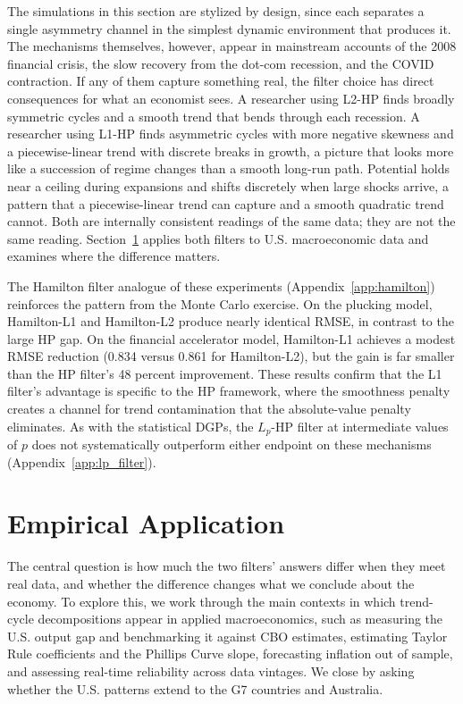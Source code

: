 \documentclass[10pt]{article}
\begin{document}
The simulations in this section are stylized by design, since each separates a single asymmetry channel in the simplest dynamic environment that produces it. The mechanisms themselves, however, appear in mainstream accounts of the 2008 financial crisis, the slow recovery from the dot-com recession, and the COVID contraction. If any of them capture something real, the filter choice has direct consequences for what an economist sees. A researcher using L2-HP finds broadly symmetric cycles and a smooth trend that bends through each recession. A researcher using L1-HP finds asymmetric cycles with more negative skewness and a piecewise-linear trend with discrete breaks in growth, a picture that looks more like a succession of regime changes than a smooth long-run path. Potential holds near a ceiling during expansions and shifts discretely when large shocks arrive, a pattern that a piecewise-linear trend can capture and a smooth quadratic trend cannot. Both are internally consistent readings of the same data; they are not the same reading. Section~\ref{sec:empirical} applies both filters to U.S. macroeconomic data and examines where the difference matters.

The Hamilton filter analogue of these experiments (Appendix~\ref{app:hamilton}) reinforces the pattern from the Monte Carlo exercise. On the plucking model, Hamilton-L1 and Hamilton-L2 produce nearly identical RMSE, in contrast to the large HP gap. On the financial accelerator model, Hamilton-L1 achieves a modest RMSE reduction (0.834 versus 0.861 for Hamilton-L2), but the gain is far smaller than the HP filter's 48 percent improvement. These results confirm that the L1 filter's advantage is specific to the HP framework, where the smoothness penalty creates a channel for trend contamination that the absolute-value penalty eliminates. As with the statistical DGPs, the $L_p$-HP filter at intermediate values of $p$ does not systematically outperform either endpoint on these mechanisms (Appendix~\ref{app:lp_filter}).


\section{Empirical Application}
\label{sec:empirical}

The central question is how much the two filters' answers differ when they meet real data, and whether the difference changes what we conclude about the economy. To explore this, we work through the main contexts in which trend-cycle decompositions appear in applied macroeconomics, such as measuring the U.S. output gap and benchmarking it against CBO estimates, estimating Taylor Rule coefficients and the Phillips Curve slope, forecasting inflation out of sample, and assessing real-time reliability across data vintages. We close by asking whether the U.S. patterns extend to the G7 countries and Australia.
\end{document}
